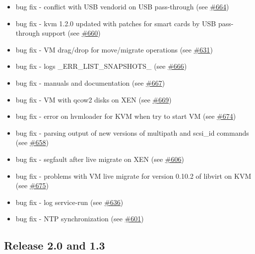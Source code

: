 \begin{itemize}
    \item bug fix - conflict with USB vendorid on USB pass-through (see \href{https://srcmaster.eurotux.com/pm/p/etva/ticket/664}{\#664})
    \item bug fix - kvm 1.2.0 updated with patches for smart cards by USB pass-through support (see \href{https://srcmaster.eurotux.com/pm/p/etva/ticket/660}{\#660})
    \item bug fix - VM drag/drop for move/migrate operations (see \href{https://srcmaster.eurotux.com/pm/p/etva/ticket/631}{\#631})
    \item bug fix - logs \_ERR\_LIST\_SNAPSHOTS\_ (see \href{https://srcmaster.eurotux.com/pm/p/etva/ticket/666}{\#666})
    \item bug fix - manuals and documentation (see \href{https://srcmaster.eurotux.com/pm/p/etva/ticket/667}{\#667})
    \item bug fix - VM with qcow2 disks on XEN (see \href{https://srcmaster.eurotux.com/pm/p/etva/ticket/669}{\#669})
    \item bug fix - error on hvmloader for KVM when try to start VM (see \href{https://srcmaster.eurotux.com/pm/p/etva/ticket/674}{\#674})
    \item bug fix - parsing output of new versions of multipath and scsi\_id commands (see \href{https://srcmaster.eurotux.com/pm/p/etva/ticket/658}{\#658})
    \item bug fix - segfault after live migrate on XEN (see \href{https://srcmaster.eurotux.com/pm/p/etva/ticket/606}{\#606})
    \item bug fix - problems with VM live migrate for version 0.10.2 of libvirt on KVM (see \href{https://srcmaster.eurotux.com/pm/p/etva/ticket/675}{\#675})
    \item bug fix - log service-run (see \href{https://srcmaster.eurotux.com/pm/p/etva/ticket/636}{\#636})
    \item bug fix - NTP synchronization (see \href{https://srcmaster.eurotux.com/pm/p/etva/ticket/601}{\#601})
\end{itemize}

\subsection{Release 2.0 and 1.3}

